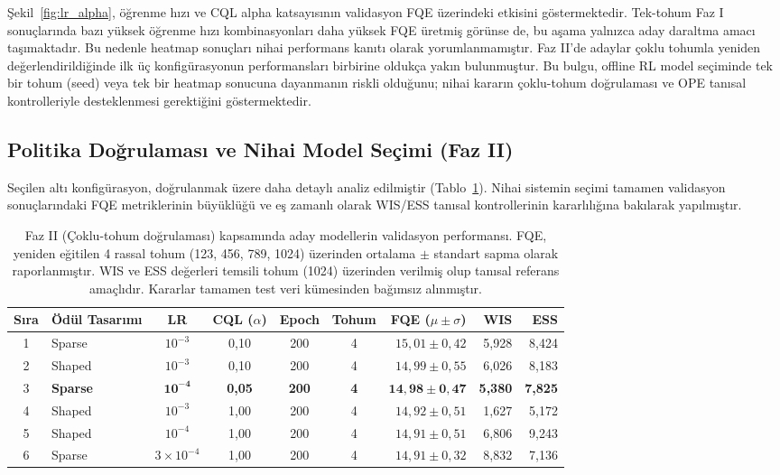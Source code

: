 \documentclass[11pt,a4paper]{article}
\begin{document}
Şekil~\ref{fig:lr_alpha}, öğrenme hızı ve CQL alpha katsayısının validasyon FQE üzerindeki etkisini göstermektedir. Tek-tohum Faz I sonuçlarında bazı yüksek öğrenme hızı kombinasyonları daha yüksek FQE üretmiş görünse de, bu aşama yalnızca aday daraltma amacı taşımaktadır. Bu nedenle heatmap sonuçları nihai performans kanıtı olarak yorumlanmamıştır. Faz II'de adaylar çoklu tohumla yeniden değerlendirildiğinde ilk üç konfigürasyonun performansları birbirine oldukça yakın bulunmuştur. Bu bulgu, offline RL model seçiminde tek bir tohum (seed) veya tek bir heatmap sonucuna dayanmanın riskli olduğunu; nihai kararın çoklu-tohum doğrulaması ve OPE tanısal kontrolleriyle desteklenmesi gerektiğini göstermektedir.

\subsection{Politika Doğrulaması ve Nihai Model Seçimi (Faz II)}
Seçilen altı konfigürasyon, doğrulanmak üzere daha detaylı analiz edilmiştir (Tablo~\ref{tab:stage2}). Nihai sistemin seçimi tamamen validasyon sonuçlarındaki FQE metriklerinin büyüklüğü ve eş zamanlı olarak WIS/ESS tanısal kontrollerinin kararlılığına bakılarak yapılmıştır.

\begin{table}[H]
\centering
\caption{Faz II (Çoklu-tohum doğrulaması) kapsamında aday modellerin validasyon performansı. FQE, yeniden eğitilen 4 rassal tohum (123, 456, 789, 1024) üzerinden ortalama $\pm$ standart sapma olarak raporlanmıştır. WIS ve ESS değerleri temsili tohum (1024) üzerinden verilmiş olup tanısal referans amaçlıdır. Kararlar tamamen test veri kümesinden bağımsız alınmıştır.}
\label{tab:stage2}
\begin{tabular}{clccccrrr}
\toprule
Sıra & Ödül Tasarımı & LR & CQL ($\alpha$) & Epoch & Tohum & FQE ($\mu \pm \sigma$) & WIS & ESS \\
\midrule
1 & Sparse & $10^{-3}$ & 0,10 & 200 & 4 & $15{,}01 \pm 0{,}42$ & 5,928 & 8,424 \\
2 & Shaped & $10^{-3}$ & 0,10 & 200 & 4 & $14{,}99 \pm 0{,}55$ & 6,026 & 8,183 \\
3 & \textbf{Sparse} & $\mathbf{10^{-4}}$ & \textbf{0,05} & \textbf{200} & \textbf{4} & $\mathbf{14{,}98 \pm 0{,}47}$ & \textbf{5,380} & \textbf{7,825} \\
4 & Shaped & $10^{-3}$ & 1,00 & 200 & 4 & $14{,}92 \pm 0{,}51$ & 1,627 & 5,172 \\
5 & Shaped & $10^{-4}$ & 1,00 & 200 & 4 & $14{,}91 \pm 0{,}51$ & 6,806 & 9,243 \\
6 & Sparse & $3\!\times\!10^{-4}$ & 1,00 & 200 & 4 & $14{,}91 \pm 0{,}32$ & 8,832 & 7,136 \\
\bottomrule
\end{tabular}
\end{table}
\end{document}
